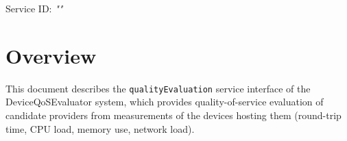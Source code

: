 \documentclass[a4paper]{arrowhead}
\begin{document}
\sloppy

\ArrowheadSetup

\begin{center}
  \vspace*{1cm}
  \huge{\arrowtitle}

  \vspace*{0.2cm}
  \LARGE{\arrowtype}
  \vspace*{1cm}

  \Large{Service ID: \textit{"\arrowid"}}

  \vspace*{\fill}


  \vspace*{1cm}
  \vspace*{\fill}

  \begin{abstract}
    This document describes the HTTP/1.1 protocol with TLS payload security and JSON payload encoding variant of the \texttt{qualityEvaluation} service of the DeviceQoSEvaluator system.
  \end{abstract}

  \vspace*{1cm}
\end{center}

\newpage

\tableofcontents
\newpage

\section{Overview}
\label{sec:overview}

This document describes the \texttt{qualityEvaluation} service interface of the DeviceQoSEvaluator system, which provides quality-of-service evaluation of candidate providers from measurements of the devices hosting them (round-trip time, CPU load, memory use, network load).
\end{document}
